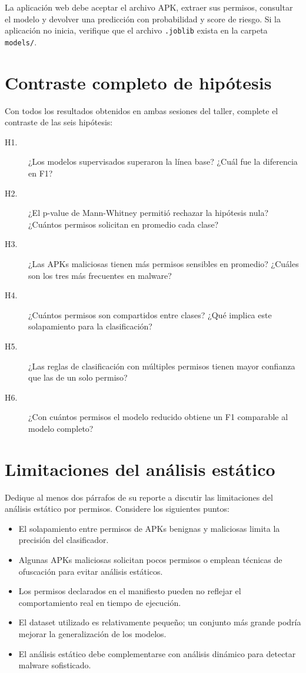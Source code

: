 \documentclass[
  coursetitle={Cómputo Nube y Tecnologías Emergentes},
  coursehours={96},
  coursedate={Verano 2026},
  doctype={Taller},
  otherlangs={english,french},
  authorname={Lázaro},
  authorsurname={Bustio-Martínez},
  authortitle={PhD},
  role={Profesor Investigador},
  email={lbustio@inaoe.mx},
  phone={5559504000},
  ext={7459},
  institution={Instituto Nacional de Astrofísica, Óptica y Electrónica (INAOE)},
  department={Maestría en Ciencias en Tecnologías de Seguridad},
  address={Luis Enrique Erro 1, Sta. Ma. Tonantzintla, San Andrés Cholula, CP 72840, Puebla, México},
  margin={0.5in}
]{../../lbustio_lecture_notes}
\begin{document}
\begin{tcolorbox}[title=Punto de control 3]
La aplicación web debe aceptar el archivo APK, extraer sus permisos, consultar el modelo y devolver una predicción con probabilidad y score de riesgo. Si la aplicación no inicia, verifique que el archivo \texttt{.joblib} exista en la carpeta \texttt{models/}.
\end{tcolorbox}

\section{Contraste completo de hipótesis}

Con todos los resultados obtenidos en ambas sesiones del taller, complete el contraste de las seis hipótesis:

\begin{description}
    \item[H1.] ¿Los modelos supervisados superaron la línea base? ¿Cuál fue la diferencia en F1?
    \item[H2.] ¿El p-value de Mann-Whitney permitió rechazar la hipótesis nula? ¿Cuántos permisos solicitan en promedio cada clase?
    \item[H3.] ¿Las APKs maliciosas tienen más permisos sensibles en promedio? ¿Cuáles son los tres más frecuentes en malware?
    \item[H4.] ¿Cuántos permisos son compartidos entre clases? ¿Qué implica este solapamiento para la clasificación?
    \item[H5.] ¿Las reglas de clasificación con múltiples permisos tienen mayor confianza que las de un solo permiso?
    \item[H6.] ¿Con cuántos permisos el modelo reducido obtiene un F1 comparable al modelo completo?
\end{description}

\section{Limitaciones del análisis estático}

Dedique al menos dos párrafos de su reporte a discutir las limitaciones del análisis estático por permisos. Considere los siguientes puntos:

\begin{itemize}
    \item El solapamiento entre permisos de APKs benignas y maliciosas limita la precisión del clasificador.
    \item Algunas APKs maliciosas solicitan pocos permisos o emplean técnicas de ofuscación para evitar análisis estáticos.
    \item Los permisos declarados en el manifiesto pueden no reflejar el comportamiento real en tiempo de ejecución.
    \item El dataset utilizado es relativamente pequeño; un conjunto más grande podría mejorar la generalización de los modelos.
    \item El análisis estático debe complementarse con análisis dinámico para detectar malware sofisticado.
\end{itemize}
\end{document}
